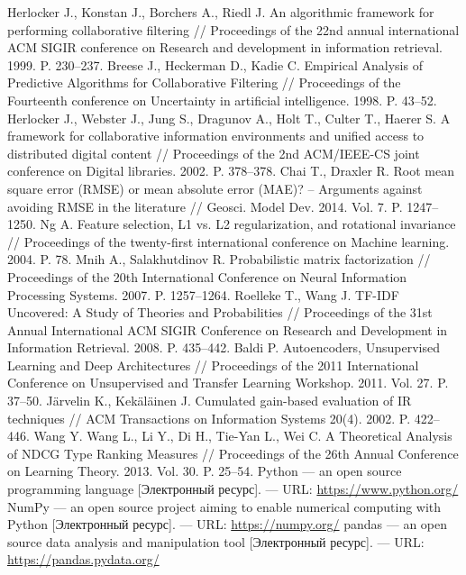 \documentclass[a4paper,article,14pt]{extarticle}
\begin{document}
\begin{thebibliography}{1}
 Herlocker J., Konstan J., Borchers A., Riedl J. An algorithmic framework for performing collaborative filtering // Proceedings of the 22nd annual international ACM SIGIR conference on Research and development in information retrieval. 1999. P. 230--237.
 Breese J., Heckerman D., Kadie C. Empirical Analysis of Predictive Algorithms for Collaborative Filtering // Proceedings of the Fourteenth conference on Uncertainty in artificial intelligence. 1998. P. 43--52.
 Herlocker J., Webster J., Jung S., Dragunov A., Holt T., Culter T., Haerer S. A framework for collaborative information environments and unified access to distributed digital content // Proceedings of the 2nd ACM/IEEE-CS joint conference on Digital libraries. 2002. P. 378--378.
 Chai T., Draxler R. Root mean square error (RMSE) or mean absolute error (MAE)? – Arguments against avoiding RMSE in the literature // Geosci. Model Dev. 2014. Vol. 7. P. 1247--1250.
 Ng A. Feature selection, L1 vs. L2 regularization, and rotational invariance // Proceedings of the twenty-first international conference on Machine learning. 2004. P. 78.
 Mnih A., Salakhutdinov R. Probabilistic matrix factorization // Proceedings of the 20th International Conference on Neural Information Processing Systems. 2007. P. 1257--1264.
 Roelleke T., Wang J. TF-IDF Uncovered: A Study of Theories and Probabilities // Proceedings of the 31st Annual International ACM SIGIR Conference on Research and Development in Information Retrieval. 2008. P. 435--442.
 Baldi P. Autoencoders, Unsupervised Learning and Deep Architectures // Proceedings of the 2011 International Conference on Unsupervised and Transfer Learning Workshop. 2011. Vol. 27. P. 37--50.
 Järvelin K., Kekäläinen J.  Cumulated gain-based evaluation of IR techniques // ACM Transactions on Information Systems 20(4). 2002. P. 422--446.
 Wang Y. Wang L., Li Y., Di H., Tie-Yan L., Wei C.  A Theoretical Analysis of NDCG Type Ranking Measures // Proceedings of the 26th Annual Conference on Learning Theory. 2013. Vol. 30. P. 25--54.
 Python --- an open source programming language [Электронный ресурс]. --- URL: \url{https://www.python.org/}
 NumPy --- an open source project aiming to enable numerical computing with Python [Электронный ресурс]. --- URL: \url{https://numpy.org/}
 pandas --- an open source data analysis and manipulation tool [Электронный ресурс]. --- URL: \url{https://pandas.pydata.org/}

\end{thebibliography}
\end{document}
